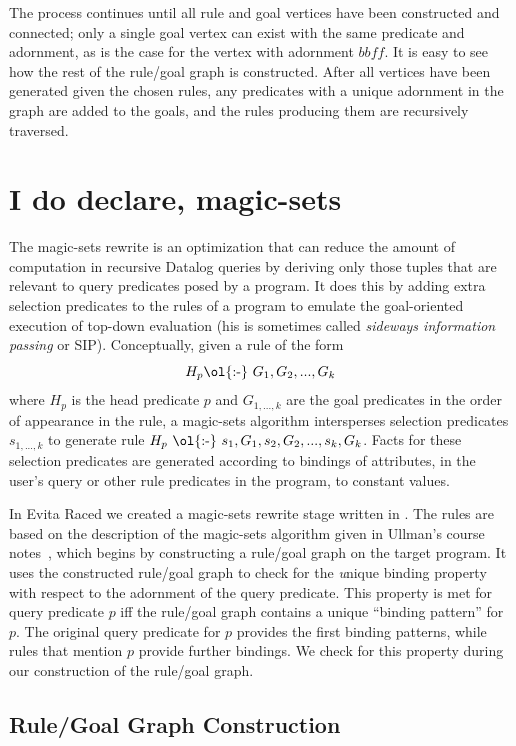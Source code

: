 The process continues until all rule and goal vertices have been constructed
and connected; only a single goal vertex can exist with the same predicate and
adornment, as is the case for the  vertex with adornment
$\mathit{bbff}$.  It is easy to see how the rest of the rule/goal graph is
constructed.  After all vertices have been generated given the chosen rules,
any predicates with a unique adornment in the graph are added to the goals, and
the rules producing them are recursively traversed.

\section{I do declare, magic-sets}

The magic-sets rewrite is an optimization that can reduce the amount of
computation in recursive Datalog queries by deriving only those tuples that are
relevant to query predicates posed by a program.  It does this by adding extra
selection predicates to the rules of a program to emulate the goal-oriented
execution of top-down evaluation (his is sometimes called \emph{sideways
information passing} or SIP).  Conceptually, given a rule of the form 
\[ H_p \text{\ol{:-}}\ G_1, G_2, ..., G_k \] where $H_p$ is the head predicate $p$ and
$G_{1,...,k}$ are the goal predicates in the order of appearance in the rule, a
magic-sets algorithm intersperses selection predicates $s_{1,...,k}$ to
generate rule $H_p \ \text{\ol{:-}}\ s_1, G_1, s_2, G_2, ..., s_{k}, G_k$.
Facts for these selection predicates are generated according to bindings of
attributes, in the user's query or other rule predicates in the program, to
constant values.  

In Evita Raced we created a magic-sets rewrite stage written
in \OVERLOG.  The \OVERLOG rules are based on the description of the magic-sets
algorithm given in Ullman's course notes~\cite{ullmanNotes}, which begins
by constructing a rule/goal graph on the target program. It uses the
constructed rule/goal graph to check for the {\emph unique binding property} with
respect to the adornment of the query predicate. This property is met for query
predicate $p$ iff the rule/goal graph contains a unique ``binding pattern'' for
$p$. The original query predicate for $p$ provides the first binding patterns, 
while rules that mention $p$ provide further bindings. We check for this property
during our construction of the rule/goal graph. 


\subsection{Rule/Goal Graph Construction}
\label{ch:evita:sec:rgconstruct}

